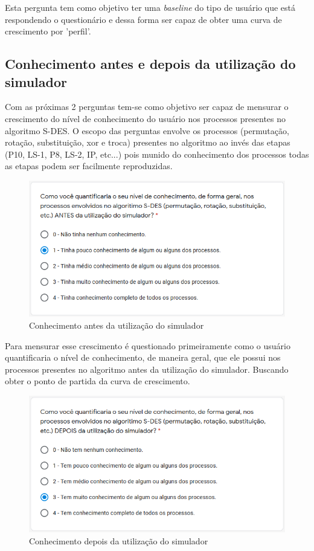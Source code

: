 Esta pergunta tem como objetivo ter uma \textit{baseline} do tipo de usuário que está respondendo o questionário e dessa forma ser capaz de obter uma curva de crescimento por 'perfil'.

\subsection{Conhecimento antes e depois da utilização do simulador}
Com as próximas 2 perguntas tem-se como objetivo ser capaz de mensurar o crescimento do nível de conhecimento do usuário nos processos presentes no algoritmo S-DES. O escopo das perguntas envolve os processos (permutação, rotação, substituição, xor e troca) presentes no algoritmo ao invés das etapas (P10, LS-1, P8, LS-2, IP, etc...) pois munido do conhecimento dos processos todas as etapas podem ser facilmente reproduzidas.

\begin{figure}[H]
    \centering
    \caption{Conhecimento antes da utilização do simulador}
    \includegraphics[width=0.75\linewidth]{Questionario/Q2.png}
\end{figure}

Para mensurar esse crescimento é questionado primeiramente como o usuário quantificaria o nível de conhecimento, de maneira geral, que ele possui nos processos presentes no algoritmo antes da utilização do simulador. Buscando obter o ponto de partida da curva de crescimento.

\begin{figure}[H]
    \centering
    \caption{Conhecimento depois da utilização do simulador}
    \includegraphics[width=0.75\linewidth]{Questionario/Q3.png}
\end{figure}

